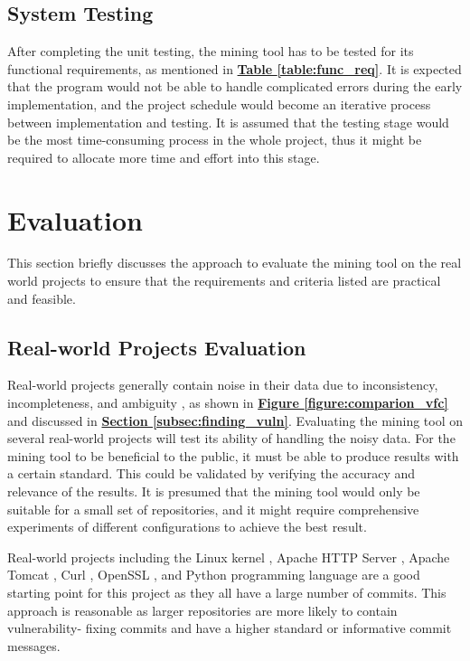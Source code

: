 \documentclass[12pt, a4paper]{report}
\begin{document}
\subsection{System Testing}
After completing the unit testing, the mining tool has to be tested for its functional requirements,
as mentioned in \hyperref[table:func_req]{\textbf{Table \ref*{table:func_req}}}. It is expected that
the program would not be able to handle complicated errors during the early implementation, and the
project schedule would become an iterative process between implementation and testing. It is assumed
that the testing stage would be the most time-consuming process in the whole project, thus it might
be required to allocate more time and effort into this stage.

\section{Evaluation}
This section briefly discusses the approach to evaluate the mining tool on the real world projects
to ensure that the requirements and criteria listed are practical and feasible.

\subsection{Real-world Projects Evaluation} \label{sec:realworld}
Real-world projects generally contain noise in their data due to inconsistency, incompleteness, and
ambiguity \cite{alqahtani_2016}, as shown in \hyperref[figure:comparion_vfc]{\textbf{Figure
\ref*{figure:comparion_vfc}}} and discussed in \hyperref[subsec:finding_vuln]{\textbf{Section
\ref*{subsec:finding_vuln}}}. Evaluating the mining tool on several real-world projects will test
its ability of handling the noisy data. For the mining tool to be beneficial to the public, it must
be able to produce results with a certain standard. This could be validated by verifying the
accuracy and relevance of the results. It is presumed that the mining tool would only be suitable
for a small set of repositories, and it might require comprehensive experiments of different
configurations to achieve the best result.

Real-world projects including the Linux kernel \cite{linux_repo}, Apache HTTP Server
\cite{apache_httpd_repo}, Apache Tomcat \cite{apache_tomcat_repo}, Curl \cite{curl_repo}, OpenSSL
\cite{openssl_repo}, and Python programming language \cite{cpython_repo} are a good starting point
for this project as they all have a large number of commits. This approach is reasonable as larger
repositories are more likely to contain vulnerability- fixing commits and have a higher standard or
informative commit messages.
\end{document}

